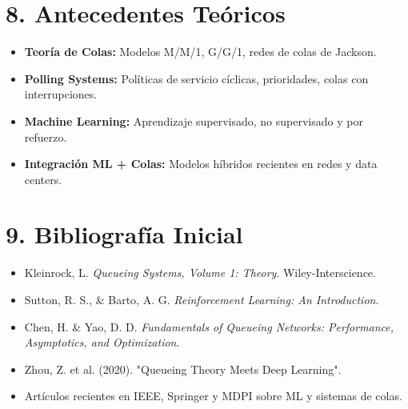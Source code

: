 \documentclass[12pt]{article}
\begin{document}
\section*{8. Antecedentes Te\'oricos}
\begin{itemize}
  \item \textbf{Teor\'ia de Colas:} Modelos M/M/1, G/G/1, redes de colas de Jackson.
  \item \textbf{Polling Systems:} Pol\'iticas de servicio c\'iclicas, prioridades, colas con interrupciones.
  \item \textbf{Machine Learning:} Aprendizaje supervisado, no supervisado y por refuerzo.
  \item \textbf{Integraci\'on ML + Colas:} Modelos h\'ibridos recientes en redes y data centers.
\end{itemize}

\section*{9. Bibliograf\'ia Inicial}
\begin{itemize}
  \item Kleinrock, L. \textit{Queueing Systems, Volume 1: Theory}. Wiley-Interscience.
  \item Sutton, R. S., \& Barto, A. G. \textit{Reinforcement Learning: An Introduction}.
  \item Chen, H. \& Yao, D. D. \textit{Fundamentals of Queueing Networks: Performance, Asymptotics, and Optimization}.
  \item Zhou, Z. et al. (2020). "Queueing Theory Meets Deep Learning".
  \item Art\'iculos recientes en IEEE, Springer y MDPI sobre ML y sistemas de colas.
\end{itemize}
\end{document}

